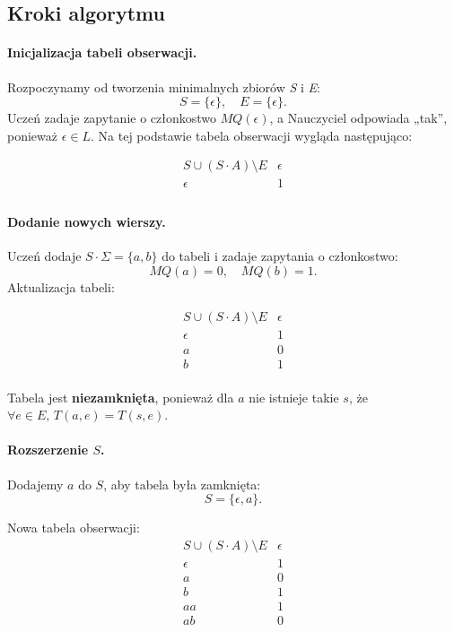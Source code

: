 \subsection*{Kroki algorytmu}

\paragraph*{Inicjalizacja tabeli obserwacji.}
Rozpoczynamy od tworzenia minimalnych zbiorów \textit{S} i \textit{E}:
\[
S = \{\epsilon\}, \quad E = \{\epsilon\}.
\]
Uczeń zadaje zapytanie o członkostwo \( MQ(\epsilon) \), a Nauczyciel odpowiada „tak”, ponieważ \( \epsilon \in L \). Na tej podstawie tabela obserwacji wygląda następująco:

\[
\begin{array}{c|c}
S \cup (S \cdot A) \setminus E & \epsilon \\
\hline
\epsilon      & 1 \\
\end{array}
\]

\paragraph*{Dodanie nowych wierszy.}
Uczeń dodaje \( S \cdot \Sigma = \{a, b\} \) do tabeli i zadaje zapytania o członkostwo:
\[
MQ(a) = 0, \quad MQ(b) = 1.
\]
Aktualizacja tabeli:

\[
\begin{array}{c|c}
S \cup (S \cdot A) \setminus E & \epsilon \\
\hline
\epsilon      & 1 \\
\hline
a             & 0 \\
b             & 1 \\
\end{array}
\]

Tabela jest \textbf{niezamknięta}, ponieważ dla \(a\) nie istnieje takie \(s\), że \( \forall e \in E, \, T(a, e) = T(s, e) \).

\paragraph*{Rozszerzenie \( S \).}
Dodajemy \( a \) do \( S \), aby tabela była zamknięta:
\[
S = \{\epsilon, a\}.
\]

Nowa tabela obserwacji:
\[
\begin{array}{c|c}
S \cup (S \cdot A) \setminus E & \epsilon \\
\hline
\epsilon      & 1 \\
a             & 0 \\
\hline
b             & 1 \\
aa            & 1 \\
ab            & 0 \\
\end{array}
\]


